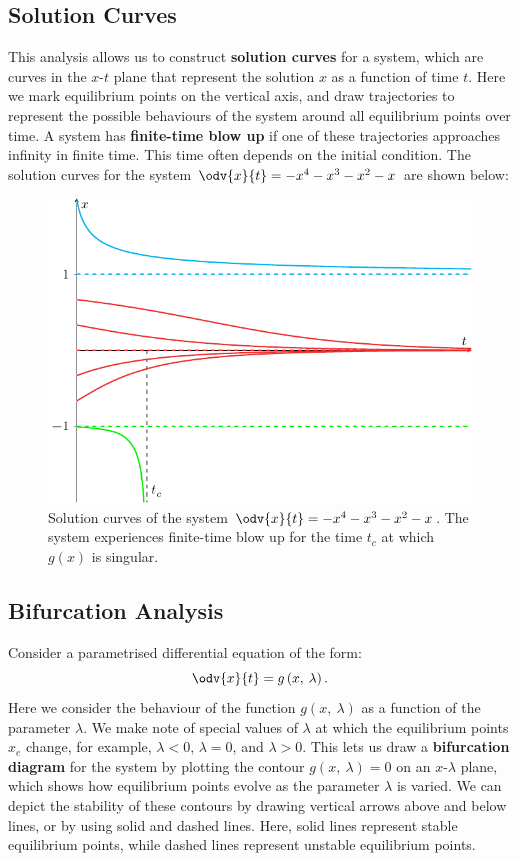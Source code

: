 \documentclass{article}
\begin{document}
\subsection{Solution Curves}
This analysis allows us to construct \textbf{solution curves} for a
system, which are curves in the \(x\)-\(t\) plane that represent the
solution \(x\) as a function of time \(t\). Here we mark equilibrium
points on the vertical axis, and draw trajectories to represent the
possible behaviours of the system around all equilibrium points over
time. A system has \textbf{finite-time blow up} if one of these
trajectories approaches infinity in finite time. This time often
depends on the initial condition. The solution curves for the system
\(\odv{x}{t} = -x^4 - x^3 - x^2 - x\) are shown below:
\begin{figure}[H]
    \centering
    \includegraphics[width = 0.8\linewidth]{figures/solution_curve_analysis.pdf}
    \caption{Solution curves of the system \(\odv{x}{t} = -x^4 - x^3 - x^2 - x\).
        The system experiences finite-time blow up for the time \(t_c\) at which
        \(g\left( x \right)\) is singular.}
\end{figure}
\subsection{Bifurcation Analysis}
Consider a parametrised differential equation of the form:
\begin{equation*}
    \odv{x}{t} = g\left( x,\: \lambda \right).
\end{equation*}
Here we consider the behaviour of the function
\(g\left( x,\: \lambda \right)\) as a function of the parameter
\(\lambda\). We make note of special values of \(\lambda\) at which the
equilibrium points \(x_e\) change, for example, \(\lambda < 0\),
\(\lambda = 0\), and \(\lambda > 0\). This lets us draw a
\textbf{bifurcation diagram} for the system by plotting the contour
\(g\left( x,\: \lambda \right) = 0\) on an \(x\)-\(\lambda\) plane, which shows
how equilibrium points evolve as the parameter \(\lambda\) is varied. We
can depict the stability of these contours by drawing vertical arrows
above and below lines, or by using solid and dashed lines. Here, solid
lines represent stable equilibrium points, while dashed lines represent
unstable equilibrium points.
\end{document}
